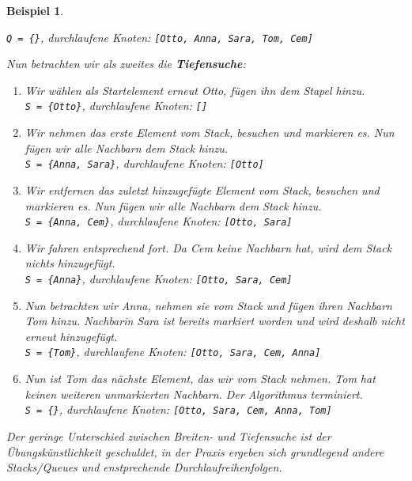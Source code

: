 \documentclass[11pt,a4paper]{scrartcl}
\newtheorem{example}{Beispiel}
\begin{document}
\begin{example}
\begin{enumerate}
\texttt{Q = \{\}}, durchlaufene Knoten: \texttt{[Otto, Anna, Sara, Tom, Cem]}
\end{enumerate}
Nun betrachten wir als zweites die \textbf{Tiefensuche}:
\begin{enumerate}
\item Wir wählen als Startelement erneut Otto, fügen ihn dem Stapel hinzu. \\
\texttt{S = \{Otto\}}, durchlaufene Knoten: \texttt{[]}
\item Wir nehmen das erste Element vom Stack, besuchen und markieren es. Nun fügen wir alle Nachbarn dem Stack hinzu. \\
\texttt{S = \{Anna, Sara\}}, durchlaufene Knoten: \texttt{[Otto]}
\item Wir entfernen das zuletzt hinzugefügte Element vom Stack, besuchen und markieren es. Nun fügen wir alle Nachbarn dem Stack hinzu. \\
\texttt{S = \{Anna, Cem\}}, durchlaufene Knoten: \texttt{[Otto, Sara]}
\item Wir fahren entsprechend fort. Da Cem keine Nachbarn hat, wird dem Stack nichts hinzugefügt.\\
\texttt{S = \{Anna\}}, durchlaufene Knoten: \texttt{[Otto, Sara, Cem]}
\item Nun betrachten wir Anna, nehmen sie vom Stack und fügen ihren Nachbarn Tom hinzu. Nachbarin Sara ist bereits markiert worden und wird deshalb nicht erneut hinzugefügt. \\
\texttt{S = \{Tom\}}, durchlaufene Knoten: \texttt{[Otto, Sara, Cem, Anna]}
\item Nun ist Tom das nächste Element, das wir vom Stack nehmen. Tom hat keinen weiteren unmarkierten Nachbarn. Der Algorithmus terminiert.\\
\texttt{S = \{\}}, durchlaufene Knoten: \texttt{[Otto, Sara, Cem, Anna, Tom]}
\end{enumerate}
Der geringe Unterschied zwischen Breiten- und Tiefensuche ist der Übungskünstlichkeit geschuldet, in der Praxis ergeben sich grundlegend andere Stacks/Queues und enstprechende Durchlaufreihenfolgen.
\end{example}
\end{document}
